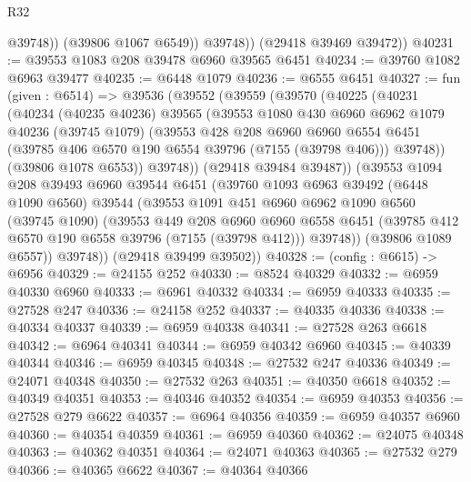 \begin{lexlean}{R32}
\begin{coremodule}
                @39748))
            (@39806 @1067 @6549))
          @39748))
      (@29418 @39469 @39472))
@40231 := @39553 @1083 @208 @39478 @6960 @39565 @6451
@40234 := @39760 @1082 @6963 @39477
@40235 := @6448 @1079
@40236 := @6555 @6451
@40327 := fun (given : @6514) =>
  @39536
    (@39552
      (@39559
        (@39570
          (@40225
            (@40231
              (@40234
                (@40235 @40236)
                @39565
                (@39553
                  @1080
                  @430
                  @6960
                  @6962
                  @1079
                  @40236
                  (@39745 @1079)
                  (@39553
                    @428
                    @208
                    @6960
                    @6960
                    @6554
                    @6451
                    (@39785 @406 @6570 @190 @6554 @39796 (@7155 (@39798 @406)))
                    @39748))
                (@39806 @1078 @6553))
              @39748))
          (@29418 @39484 @39487))
        (@39553
          @1094
          @208
          @39493
          @6960
          @39544
          @6451
          (@39760
            @1093
            @6963
            @39492
            (@6448 @1090 @6560)
            @39544
            (@39553
              @1091
              @451
              @6960
              @6962
              @1090
              @6560
              (@39745 @1090)
              (@39553
                @449
                @208
                @6960
                @6960
                @6558
                @6451
                (@39785 @412 @6570 @190 @6558 @39796 (@7155 (@39798 @412)))
                @39748))
            (@39806 @1089 @6557))
          @39748))
      (@29418 @39499 @39502))
@40328 := (config : @6615) -> @6956
@40329 := @24155 @252
@40330 := @8524 @40329
@40332 := @6959 @40330 @6960
@40333 := @6961 @40332
@40334 := @6959 @40333
@40335 := @27528 @247
@40336 := @24158 @252
@40337 := @40335 @40336
@40338 := @40334 @40337
@40339 := @6959 @40338
@40341 := @27528 @263 @6618
@40342 := @6964 @40341
@40344 := @6959 @40342 @6960
@40345 := @40339 @40344
@40346 := @6959 @40345
@40348 := @27532 @247 @40336
@40349 := @24071 @40348
@40350 := @27532 @263
@40351 := @40350 @6618
@40352 := @40349 @40351
@40353 := @40346 @40352
@40354 := @6959 @40353
@40356 := @27528 @279 @6622
@40357 := @6964 @40356
@40359 := @6959 @40357 @6960
@40360 := @40354 @40359
@40361 := @6959 @40360
@40362 := @24075 @40348
@40363 := @40362 @40351
@40364 := @24071 @40363
@40365 := @27532 @279
@40366 := @40365 @6622
@40367 := @40364 @40366

\end{coremodule}
\end{lexlean}

